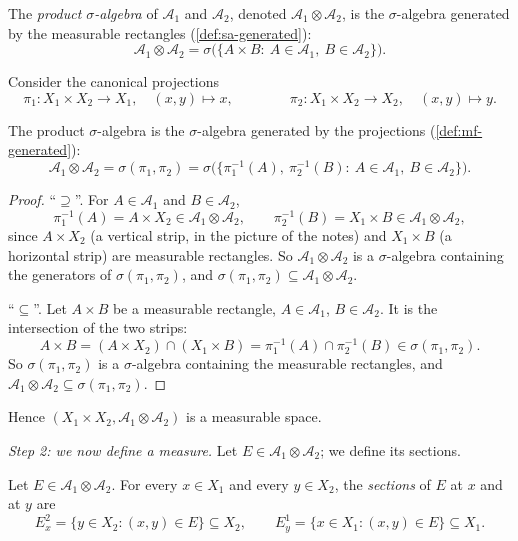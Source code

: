 \begin{definition}\label{def:pm-product-sigma}
The \emph{product $\sigma$-algebra} of $\mathcal A_1$ and $\mathcal A_2$, denoted
$\mathcal A_1\otimes\mathcal A_2$, is the $\sigma$-algebra generated by the measurable
rectangles (\cref{def:sa-generated}):
\[
  \mathcal A_1\otimes\mathcal A_2=\sigma\big(\{A\times B:\ A\in\mathcal A_1,\ B\in\mathcal A_2\}\big).
\]
\end{definition}

Consider the canonical projections
\[
  \pi_1:X_1\times X_2\to X_1,\quad (x,y)\mapsto x,\qquad\qquad
  \pi_2:X_1\times X_2\to X_2,\quad (x,y)\mapsto y .
\]

\begin{proposition}\label{prop:pm-projections}
The product $\sigma$-algebra is the $\sigma$-algebra generated by the projections
(\cref{def:mf-generated}):
\[
  \mathcal A_1\otimes\mathcal A_2=\sigma(\pi_1,\pi_2)
  =\sigma\big(\{\pi_1^{-1}(A),\ \pi_2^{-1}(B):\ A\in\mathcal A_1,\ B\in\mathcal A_2\}\big).
\]
\end{proposition}

\begin{proof}
``$\supseteq$''. For $A\in\mathcal A_1$ and $B\in\mathcal A_2$,
\[
  \pi_1^{-1}(A)=A\times X_2\in\mathcal A_1\otimes\mathcal A_2,\qquad
  \pi_2^{-1}(B)=X_1\times B\in\mathcal A_1\otimes\mathcal A_2,
\]
since $A\times X_2$ (a vertical strip, in the picture of the notes) and $X_1\times B$ (a
horizontal strip) are measurable rectangles. So $\mathcal A_1\otimes\mathcal A_2$ is a
$\sigma$-algebra containing the generators of $\sigma(\pi_1,\pi_2)$, and
$\sigma(\pi_1,\pi_2)\subseteq\mathcal A_1\otimes\mathcal A_2$.

``$\subseteq$''. Let $A\times B$ be a measurable rectangle, $A\in\mathcal A_1$,
$B\in\mathcal A_2$. It is the intersection of the two strips:
\[
  A\times B=(A\times X_2)\cap(X_1\times B)=\pi_1^{-1}(A)\cap\pi_2^{-1}(B)\in\sigma(\pi_1,\pi_2).
\]
So $\sigma(\pi_1,\pi_2)$ is a $\sigma$-algebra containing the measurable rectangles, and
$\mathcal A_1\otimes\mathcal A_2\subseteq\sigma(\pi_1,\pi_2)$.
\end{proof}

Hence $(X_1\times X_2,\mathcal A_1\otimes\mathcal A_2)$ is a measurable space.

\emph{Step 2: we now define a measure.} Let $E\in\mathcal A_1\otimes\mathcal A_2$; we define
its sections.

\begin{definition}[Sections]\label{def:pm-sections}
Let $E\in\mathcal A_1\otimes\mathcal A_2$. For every $x\in X_1$ and every $y\in X_2$, the
\emph{sections} of $E$ at $x$ and at $y$ are
\[
  E^2_x=\{y\in X_2:(x,y)\in E\}\subseteq X_2,\qquad
  E^1_y=\{x\in X_1:(x,y)\in E\}\subseteq X_1 .
\]
\end{definition}

